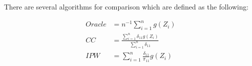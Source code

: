 \documentclass[12pt]{article}
\begin{document}
There are several algorithms for comparison which are defined as the following:

\begin{align*}
  Oracle &= n^{-1} \sum_{i = 1}^n g(Z_i)\\
  CC &= \frac{\sum_{i = 1}^n \delta_{11} g(Z_i)}{\sum_{i = 1}^n \delta_{11}} \\
  IPW &= \sum_{i = 1}^n \frac{\delta_{11}}{\pi_{11}} g(Z_i)\\
\end{align*}
\end{document}
